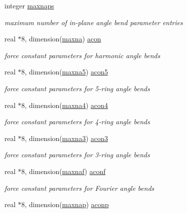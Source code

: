 \begin{DoxyCompactItemize}
integer \hyperlink{classkangs_a6646c9ed34bc273addaebe53e7ece288}{maxnaps}
\begin{DoxyCompactList}\small\item\em maximum number of in-\/plane angle bend parameter entries \end{DoxyCompactList}\item 
real $\ast$8, dimension(\hyperlink{classkangs_a219b9491df85352c42fb06b082f1fce2}{maxna}) \hyperlink{classkangs_a2fb695824cd8ddcc728928f17bd3a849}{acon}
\begin{DoxyCompactList}\small\item\em force constant parameters for harmonic angle bends \end{DoxyCompactList}\item 
real $\ast$8, dimension(\hyperlink{classkangs_af188b59476d50504dd8aa39359285894}{maxna5}) \hyperlink{classkangs_a0d230fc1b45ed6bd51f256e0eb019288}{acon5}
\begin{DoxyCompactList}\small\item\em force constant parameters for 5-\/ring angle bends \end{DoxyCompactList}\item 
real $\ast$8, dimension(\hyperlink{classkangs_a65b59f16cd39d33f1686bf32e362e6c9}{maxna4}) \hyperlink{classkangs_a4ec467bca16ca8dfc4257b00c1b5960e}{acon4}
\begin{DoxyCompactList}\small\item\em force constant parameters for 4-\/ring angle bends \end{DoxyCompactList}\item 
real $\ast$8, dimension(\hyperlink{classkangs_a121c0c19e92533f59e8c9b276e200da5}{maxna3}) \hyperlink{classkangs_a8da9a28628dad91da237adc26d9241f6}{acon3}
\begin{DoxyCompactList}\small\item\em force constant parameters for 3-\/ring angle bends \end{DoxyCompactList}\item 
real $\ast$8, dimension(\hyperlink{classkangs_a3f749f34ae8245564a10206341a2dbdd}{maxnaf}) \hyperlink{classkangs_a70fc76818cea5d69e8cab06e440f79ca}{aconf}
\begin{DoxyCompactList}\small\item\em force constant parameters for Fourier angle bends \end{DoxyCompactList}\item 
real $\ast$8, dimension(\hyperlink{classkangs_aaa36915cbec793691849f7f04c409e24}{maxnap}) \hyperlink{classkangs_ad4cfec56d1a070afa1a9e0dc8d2bea9a}{aconp}

\end{DoxyCompactItemize}
